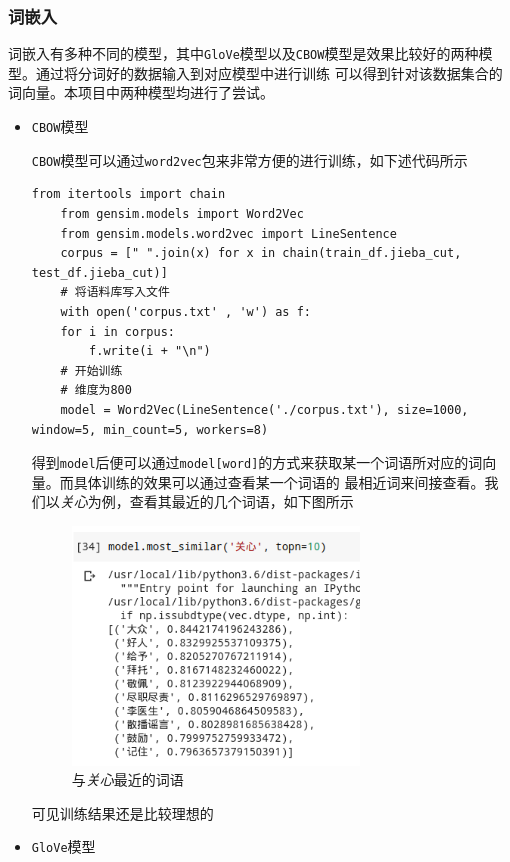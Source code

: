 \documentclass[UTF8]{ctexart}
\begin{document}
\subsubsection*{词嵌入}
词嵌入有多种不同的模型，其中\lstinline{GloVe}模型以及\lstinline{CBOW}模型是效果比较好的两种模型。通过将分词好的数据输入到对应模型中进行训练
可以得到针对该数据集合的词向量。本项目中两种模型均进行了尝试。
\begin{itemize}
    \item \lstinline{CBOW}模型
    
    \lstinline{CBOW}模型可以通过\lstinline{word2vec}包来非常方便的进行训练，如下述代码所示
    \begin{lstlisting}[]
    from itertools import chain
    from gensim.models import Word2Vec
    from gensim.models.word2vec import LineSentence
    corpus = [" ".join(x) for x in chain(train_df.jieba_cut, test_df.jieba_cut)]
    # 将语料库写入文件
    with open('corpus.txt' , 'w') as f:
    for i in corpus:
        f.write(i + "\n")
    # 开始训练
    # 维度为800
    model = Word2Vec(LineSentence('./corpus.txt'), size=1000, window=5, min_count=5, workers=8)
    \end{lstlisting}
    得到\lstinline{model}后便可以通过\lstinline{model[word]}的方式来获取某一个词语所对应的词向量。而具体训练的效果可以通过查看某一个词语的
    最相近词来间接查看。我们以\textit{关心}为例，查看其最近的几个词语，如下图所示
    \begin{figure}[htb]
        \centering
        \includegraphics[width=3in]{asset/关心word2vec.png}
        \caption{与\textit{关心}最近的词语} %
    \end{figure}
    可见训练结果还是比较理想的
    \newpage
    \item \lstinline{GloVe}模型
    

\end{itemize}
\end{document}
